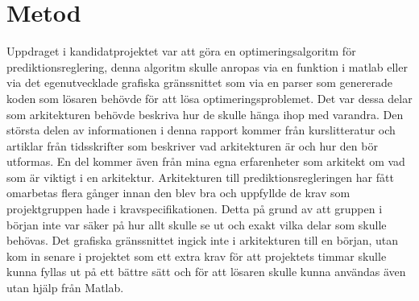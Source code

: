 \section{Metod}
Uppdraget i kandidatprojektet var att göra en optimeringsalgoritm för prediktionsreglering, denna algoritm skulle anropas via en funktion i matlab eller via det egenutvecklade grafiska gränssnittet som via en parser som genererade koden som lösaren behövde för att lösa optimeringsproblemet. Det var dessa delar som arkitekturen behövde beskriva hur de skulle hänga ihop med varandra.
\newline
\newline
Den största delen av informationen i denna rapport kommer från kurslitteratur och artiklar från tidsskrifter som beskriver vad arkitekturen är och hur den bör utformas. En del kommer även från mina egna erfarenheter som arkitekt om vad som är viktigt i en arkitektur.
\newline
\newline
Arkitekturen till prediktionsregleringen har fått omarbetas flera gånger innan den blev bra och uppfyllde de krav som projektgruppen hade i kravspecifikationen. Detta på grund av att gruppen i början inte var säker på hur allt skulle se ut och exakt vilka delar som skulle behövas. Det grafiska gränssnittet ingick inte i arkitekturen till en början, utan kom in senare i projektet som ett extra krav för att projektets timmar skulle kunna fyllas ut på ett bättre sätt och för att lösaren skulle kunna användas även utan hjälp från Matlab.

 
